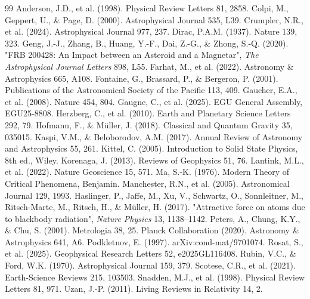 \documentclass[12pt]{article}
\theoremstyle{remark}
\begin{document}
	\begin{thebibliography}{99}
		 Anderson, J.D., et al. (1998). Physical Review Letters 81, 2858.
		 Colpi, M., Geppert, U., \& Page, D. (2000). Astrophysical Journal 535, L39.
		 Crumpler, N.R., et al. (2024). Astrophysical Journal 977, 237.
		 Dirac, P.A.M. (1937). Nature 139, 323.
		 Geng, J.-J., Zhang, B., Huang, Y.-F., Dai, Z.-G., \& Zhong, S.-Q. (2020). "FRB 200428: An Impact between an Asteroid and a Magnetar", \emph{The Astrophysical Journal Letters} 898, L55.
		 Farhat, M., et al. (2022). Astronomy \& Astrophysics 665, A108.
		 Fontaine, G., Brassard, P., \& Bergeron, P. (2001). Publications of the Astronomical Society of the Pacific 113, 409.
		 Gaucher, E.A., et al. (2008). Nature 454, 804.
		 Gaugne, C., et al. (2025). EGU General Assembly, EGU25-8808.
		 Herzberg, C., et al. (2010). Earth and Planetary Science Letters 292, 79.
		 Hofmann, F., \& Müller, J. (2018). Classical and Quantum Gravity 35, 035015.
		 Kaspi, V.M., \& Beloborodov, A.M. (2017). Annual Review of Astronomy and Astrophysics 55, 261.
		 Kittel, C. (2005). Introduction to Solid State Physics, 8th ed., Wiley.
		 Korenaga, J. (2013). Reviews of Geophysics 51, 76.
		 Lantink, M.L., et al. (2022). Nature Geoscience 15, 571.
		 Ma, S.-K. (1976). Modern Theory of Critical Phenomena, Benjamin.
		 Manchester, R.N., et al. (2005). Astronomical Journal 129, 1993.
		 Haslinger, P., Jaffe, M., Xu, V., Schwartz, O., Sonnleitner, M., Ritsch-Marte, M., Ritsch, H., \& Müller, H. (2017). "Attractive force on atoms due to blackbody radiation", \emph{Nature Physics} 13, 1138–1142.
		 Peters, A., Chung, K.Y., \& Chu, S. (2001). Metrologia 38, 25.
		 Planck Collaboration (2020). Astronomy \& Astrophysics 641, A6.
		 Podkletnov, E. (1997). arXiv:cond-mat/9701074.
		 Rosat, S., et al. (2025). Geophysical Research Letters 52, e2025GL116408.
		 Rubin, V.C., \& Ford, W.K. (1970). Astrophysical Journal 159, 379.
		 Scotese, C.R., et al. (2021). Earth-Science Reviews 215, 103503.
		 Snadden, M.J., et al. (1998). Physical Review Letters 81, 971.
		 Uzan, J.-P. (2011). Living Reviews in Relativity 14, 2.

\end{thebibliography}
\end{document}
